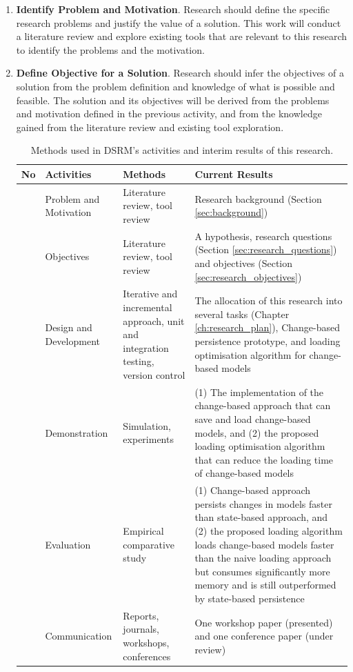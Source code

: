 \documentclass[12pt, a4paper]{report} \usepackage[titletoc]{appendix}
\begin{document}
\begin{enumerate}
    \item \textbf{Identify Problem and Motivation}. Research should define the specific research problems and justify the value of a solution. This work will conduct a literature review and explore existing tools that are relevant to this research to identify the problems and the motivation.
    \item \textbf{Define Objective for a Solution}. Research should infer the objectives of a solution from the problem definition and knowledge of what is possible and feasible. The solution and its objectives will be derived from the problems and motivation defined in the previous activity, and from the knowledge gained from the literature review and existing tool exploration.
   
   \begin{table}[H]
       \centering
       \caption{Methods used in DSRM's activities and interim results of this research.}
       \label{table:research_progress}
       \begin{tabular}
           {|>{\centering\arraybackslash}p{0.6cm}|>{\centering\arraybackslash}p{3cm}|>{\centering\arraybackslash}p{3.1cm}|>{\centering\arraybackslash}p{6.5cm}|}
           \hline 
           \textbf{No}&\textbf{Activities}&\textbf{Methods}&\textbf{Current Results}\\
           \hline 
           1 & Problem and Motivation &Literature review, tool review & Research background (Section \ref{sec:background})\\
           \hline 
           2 & Objectives & Literature review, tool review & A hypothesis, research questions (Section \ref{sec:research_questions}) and objectives  (Section \ref{sec:research_objectives})\\
           \hline 
           3 & Design and Development & Iterative and incremental approach, unit and integration testing, version control & The allocation of this research into several tasks (Chapter \ref{ch:research_plan}), Change-based persistence prototype, and loading optimisation algorithm for change-based models\\
           \hline 
           4 & Demonstration & Simulation, experiments  & (1) The implementation of the change-based approach that can save and load change-based models, and (2) the proposed loading optimisation algorithm that can reduce the loading time of change-based models \\
           \hline 
           5 & Evaluation & Empirical comparative study & (1) Change-based approach persists changes in models faster than state-based approach, and (2) the proposed loading algorithm loads change-based models faster than the naive loading approach but consumes significantly more memory  and is still outperformed by state-based persistence\\
           \hline 
           6 & Communication & Reports, journals, workshops, conferences & One workshop paper (presented) and one conference paper (under review)\\
           \hline 
       \end{tabular} 
   \end{table}
    

\end{enumerate}
\end{document}
